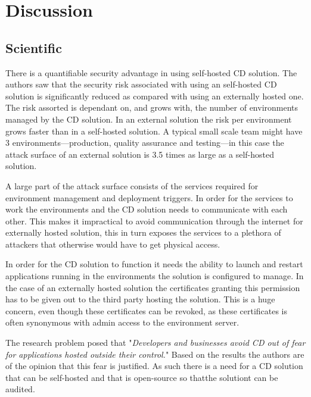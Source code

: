 \chapter{Discussion}
\label{chap:discussion}

\section{Scientific}
There is a quantifiable security advantage in using self-hosted CD solution. The authors saw that the security risk associated with using an self-hosted CD solution is significantly reduced as compared with using an externally hosted one. The risk assorted is dependant on, and grows with, the number of environments managed by the CD solution. In an external solution the risk per environment grows faster than in a self-hosted solution. A typical small scale team might have 3 environments---production, quality assurance and testing---in this case the attack surface of an external solution is 3.5 times as large as a self-hosted solution.

A large part of the attack surface consists of the services required for environment management and deployment triggers. In order for the services to work the environments and the CD solution needs to communicate with each other. This makes it impractical to avoid communication through the internet for externally hosted solution, this in turn exposes the services to a plethora of attackers that otherwise would have to get physical access.

In order for the CD solution to function it needs the ability to launch and restart applications running in the environments the solution is configured to manage. In the case of an externally hosted solution the certificates granting this permission has to be given out to the third party hosting the solution. This is a huge concern, even though these certificates can be revoked, as these certificates is often synonymous with admin access to the environment server.

The research problem posed that "\textit{Developers and businesses avoid CD out of fear for applications hosted outside their control.}" Based on the results the authors are of the opinion that this fear is justified. As such there is a need for a CD solution that can be self-hosted and that is open-source so thatthe solutiont can be audited.

